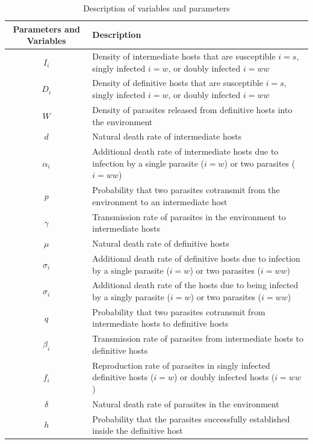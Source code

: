 \documentclass[11pt]{article}
\begin{document}
\begin{table}[!ht]
\caption{Description of variables and parameters}
\label{table:varpardescription}
\centering
\begin{tabular}{c|p{10cm}}%
\hline
Parameters and Variables    &  Description  \\
\hline
$I_i$  & Density of intermediate hosts that are susceptible $i=s$, singly infected $i=w$, or doubly infected $i=ww$ \\
\hline
$D_i$ & Density of definitive hosts that are susceptible $i=s$, singly infected $i=w$, or doubly infected $i=ww$ \\
\hline
$W$ & Density of parasites released from definitive hosts into the environment \\
\hline
$d$ & Natural death rate of intermediate hosts \\
\hline
$\alpha_i$ & Additional death rate of intermediate hosts due to infection by a single parasite ($i = w$) or two parasites ($i = ww$) \\
\hline
$p$ & Probability that two parasites cotransmit from the environment to an intermediate host \\
\hline
$\gamma$ & Transmission rate of parasites in the environment to intermediate hosts \\
\hline
$\mu$ & Natural death rate of definitive hosts \\
\hline
$\sigma_i$ & Additional death rate of definitive hosts due to infection by a single parasite ($i = w$) or two parasites ($i = ww$) \\
\hline
$\sigma_i$ & Additional death rate of the hosts due to being infected by a singly parasite ($i = w$) or two parasites ($i = ww$) \\
\hline
$q$ & Probability that two parasites cotransmit from intermediate hosts to definitive hosts \\
\hline
$\beta_i$ & Transmission rate of parasites from intermediate hosts to definitive hosts \\
\hline
$f_i$ & Reproduction rate of parasites in singly infected definitive hosts ($i = w$) or doubly infected hosts ($i = ww$)\\
\hline
$\delta$ & Natural death rate of parasites in the environment \\
\hline 
$h$ & Probability that the parasites successfully established inside the definitive host 
\end{tabular}
\bigskip{}
\end{table}
\end{document}
